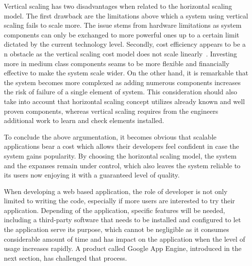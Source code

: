 Vertical scaling has two disadvantages when related to the horizontal scaling model. The first drawback are the limitations above which a system using vertical scaling fails to scale more. The issue stems from hardware limitations as system components can only be exchanged to more powerful ones up to a certain limit dictated by the current technology level. Secondly, cost efficiency appears to be a n obstacle as the vertical scaling cost model does not scale linearly~\cite[page 204]{build_scalable}. Investing more in medium class components seams to be more flexible and financially effective to make the system scale wider. On the other hand, it is remarkable that the system becomes more complexed as adding numerous components increases the risk of failure of a single element of system. This consideration should also take into account that horizontal scaling concept utilizes already known and well proven components, whereas vertical scaling requires from the engineers additional work to learn and check elements installed.

To conclude the above argumentation, it becomes obvious that scalable applications bear a cost which allows their developers feel confident in case the system gains popularity. By choosing the horizontal scaling model, the system and the expanses remain under control, which also leaves the system reliable to its users now enjoying it with a guaranteed level of quality. 

When developing a web based application, the role of developer is not only limited to writing the code, especially if more users are interested to try their application. Depending of the application, specific features will be needed, including a third-party software that needs to be installed and configured to let the application serve its purpose, which cannot be negligible as it consumes considerable amount of time and has impact on the application when the level of usage increases rapidly. A product called Google App Engine, introduced in the next section, has challenged that process.  
 
